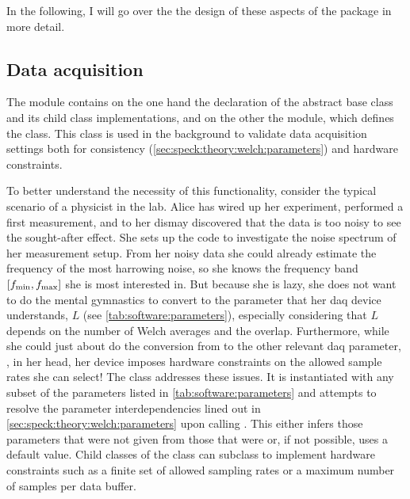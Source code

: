 In the following, I will go over the the design of these aspects of the package in more detail.

\subsection{Data acquisition}\label{sec:speck:software:design:daq}
The  module contains on the one hand the declaration of the  abstract base class and its child class implementations, and on the other the  module, which defines the  class.
This class is used in the background to validate data acquisition settings both for consistency (\cf \cref{sec:speck:theory:welch:parameters}) and hardware constraints.

To better understand the necessity of this functionality, consider the typical scenario of a physicist
in the lab.
Alice has wired up her experiment, performed a first measurement, and to her dismay discovered that the data is too noisy to see the sought-after effect.
She sets up the \pyspeck code to investigate the noise spectrum of her measurement setup.
From her noisy data she could already estimate the frequency of the most harrowing noise, so she knows the frequency band $[f_{\mathrm{min}}, f_{\mathrm{max}}]$ she is most interested in.
But because she is lazy,
she does not want to do the mental gymnastics to convert \fmin to the parameter that her \gls{daq} device understands, $L$ (see \cref{tab:software:parameters}), especially considering that $L$ depends on the number of Welch averages and the overlap.
Furthermore, while she could just about do the conversion from \fmax to the other relevant \gls{daq} parameter, \fs, in her head, her device imposes hardware constraints on the allowed sample rates she can select!
The  class addresses these issues.
It is instantiated with any subset of the parameters listed in \cref{tab:software:parameters}
and attempts to resolve the parameter interdependencies lined out in \cref{sec:speck:theory:welch:parameters} upon calling .
This either infers those parameters that were not given from those that were or, if not possible, uses a default value.
Child classes of the  class can subclass  to implement hardware constraints such as a finite set of allowed sampling rates or a maximum number of samples per data buffer.

